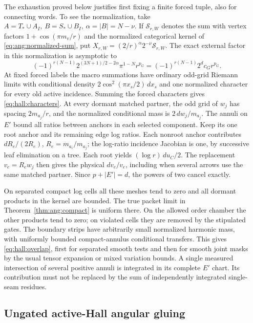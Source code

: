 The exhaustion proved below justifies first fixing a finite forced tuple,
also for connecting words. To see the normalization, take
\(A=T_*\cup A_I,\ B=S_*\cup B_I,\ \alpha=|B|=N-\nu\).
If \(\mathcal S_{r,W}\) denotes the sum with vertex factors
\(1+\cos(\pi m_v/r)\) and the normalized categorical kernel of
\eqref{eq:ang:normalized-sum}, put
\(X_{r,W}=(2/r)^\alpha 2^{-\nu}\mathcal S_{r,W}\).
The exact external factor in this normalization is asymptotic to
\[
 (-1)^{r(N-1)}2^{(3N+1)/2-2\alpha}\pi^{1-N}r^{p_G}
   =(-1)^{r(N-1)}2^d c_G r^{p_G}.
\]
At fixed forced labels the macro summations have ordinary odd-grid
Riemann limits with conditional density
\(2\cos^2(\pi x_s/2)\,dx_s\) and one normalized character for every old
active incidence. Summing the forced characters gives
\eqref{eq:hall:characters}. At every dormant matched partner, the
odd grid of \(w_j\) has spacing \(2m_{a_j}/r\), and the normalized
conditional mass is \(2\,dw_j/m_{a_j}\). The annuli on \(E'\) bound
all ratios between anchors in each selected component. Keep its
one root anchor and its remaining edge log ratios. Each nonroot
anchor contributes \(dR_e/(2R_e)\), \(R_e=m_{a_i}/m_{a_j}\);
the log-ratio incidence Jacobian is one, by successive leaf
elimination on a tree. Each root yields \((\log r)\,du_C/2\).
The replacement \(v_e=R_e w_j\) then gives the physical
\(dv_e/v_e\), including when several arrows use the same matched
partner. Since \(p+|E'|=d\), the powers of two cancel exactly.

On separated compact log cells all these meshes tend to zero and
all dormant products in the kernel are bounded. The true packet
limit in Theorem~\ref{thm:ang:compact} is uniform there. On the
allowed order chamber the other products tend to zero; on violated
cells they are removed by the stipulated gates. The boundary strips
have arbitrarily small normalized harmonic mass, with uniformly
bounded compact-annulus conditional transfers. This gives
\eqref{eq:hall:overlap}, first for separated smooth tests and then
for smooth joint masks by the usual tensor expansion or mixed
variation bounds. A single measured intersection of several
positive annuli is integrated in its complete \(E'\) chart. Its
contribution must not be replaced by the sum of independently
integrated single-seam residues.

\subsection{Ungated active-Hall angular gluing}
\label{sec:hall:leading}

